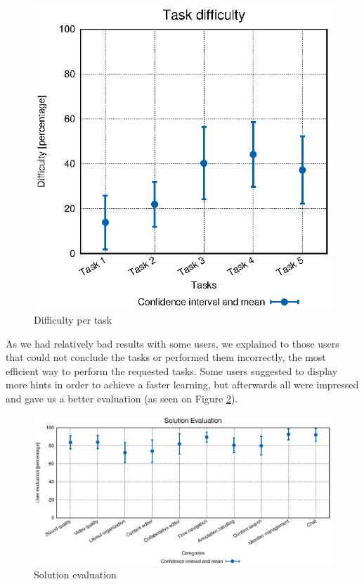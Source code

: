 \begin{figure}
\begin{minipage}{.5\textwidth}
    \includegraphics[width=\textwidth]{stats/user_diffs.eps}
  \caption{Difficulty per task}
  \label{fig:user_diffs}
\end{minipage}
\end{figure}


As we had relatively bad results with some users, we explained to those users that could not conclude the tasks or performed them incorrectly, the most efficient way to perform the requested tasks. Some users suggested to display more hints in order to achieve a faster learning, but afterwards all were impressed and gave us a better evaluation (as seen on Figure \ref{fig:user_evals}).

\begin{figure}
  \centering
  \includegraphics[width=\textwidth]{stats/user_evals.eps}
  \caption{Solution evaluation}
  \label{fig:user_evals}
\end{figure}



